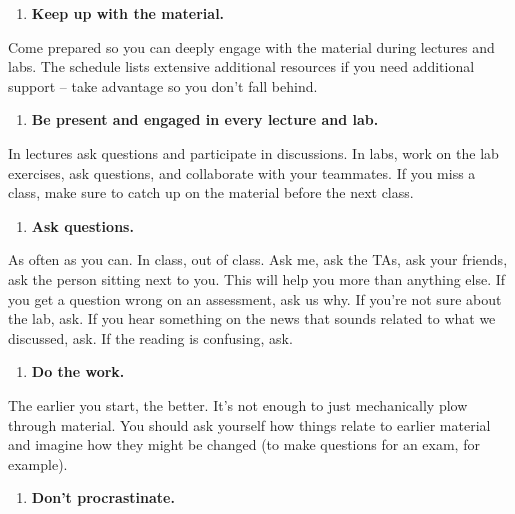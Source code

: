 \documentclass[
  letterpaper,
  DIV=11,
  numbers=noendperiod]{scrartcl}
\providecommand{\tightlist}{%
  \setlength{\itemsep}{0pt}\setlength{\parskip}{0pt}}
\begin{document}
\begin{enumerate}
\def\labelenumi{\arabic{enumi}.}
\tightlist
\item
  \textbf{Keep up with the material.}
\end{enumerate}

Come prepared so you can deeply engage with the material during lectures
and labs. The schedule lists extensive additional resources if you need
additional support -- take advantage so you don't fall behind.

\begin{enumerate}
\def\labelenumi{\arabic{enumi}.}
\setcounter{enumi}{1}
\tightlist
\item
  \textbf{Be present and engaged in every lecture and lab.}
\end{enumerate}

In lectures ask questions and participate in discussions. In labs, work
on the lab exercises, ask questions, and collaborate with your
teammates. If you miss a class, make sure to catch up on the material
before the next class.

\begin{enumerate}
\def\labelenumi{\arabic{enumi}.}
\setcounter{enumi}{2}
\tightlist
\item
  \textbf{Ask questions.}
\end{enumerate}

As often as you can. In class, out of class. Ask me, ask the TAs, ask
your friends, ask the person sitting next to you. This will help you
more than anything else. If you get a question wrong on an assessment,
ask us why. If you're not sure about the lab, ask. If you hear something
on the news that sounds related to what we discussed, ask. If the
reading is confusing, ask.

\begin{enumerate}
\def\labelenumi{\arabic{enumi}.}
\setcounter{enumi}{3}
\tightlist
\item
  \textbf{Do the work.}
\end{enumerate}

The earlier you start, the better. It's not enough to just mechanically
plow through material. You should ask yourself how things relate to
earlier material and imagine how they might be changed (to make
questions for an exam, for example).

\begin{enumerate}
\def\labelenumi{\arabic{enumi}.}
\setcounter{enumi}{4}
\tightlist
\item
  \textbf{Don't procrastinate.}
\end{enumerate}
\end{document}
